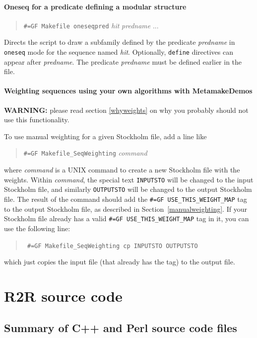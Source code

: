 \documentclass[letterpaper,12pt]{report}
\newcommand{\example}[1]{
\begin{quote}
{\raggedright
#1
}
\end{quote}
}
\newcommand{\examplett}[1]{
\example{{\tt #1}}
}
\begin{document}
\subsubsection{Oneseq for a predicate defining a modular structure}

\example{
{\tt \#=GF Makefile oneseqpred} {\it hit} {\it predname} ...
}
Directs the script to draw a subfamily defined by the predicate {\it predname}
in {\tt oneseq} mode for the sequence named {\it hit}.  Optionally, {\tt define}
directives can appear after {\it predname}.
The predicate {\it predname} must be defined earlier in the file.

\subsubsection{Weighting sequences using your own algorithms with MetamakeDemos}
\label{makefilemanualweighting}

{\bf WARNING:} please read section \ref{whyweights} on why you probably should not use this functionality.

To use manual weighting for a given Stockholm file, add a line like
\example{
{\tt \#=GF Makefile\_SeqWeighting} {\it command}
}
where {\it command} is a UNIX command to create a new Stockholm file with the weights.
Within {\it command}, the special text {\tt INPUTSTO} will be changed to the input Stockholm file, and similarly
{\tt OUTPUTSTO} will be changed to the output Stockholm file.
The result of the command should add the {\tt \#=GF USE\_THIS\_WEIGHT\_MAP} tag to the output Stockholm file,
as described in Section~\ref{manualweighting}.
If your Stockholm file already has a valid {\tt \#=GF USE\_THIS\_WEIGHT\_MAP} tag in it, you can use the following line:
\examplett{
\#=GF Makefile\_SeqWeighting cp INPUTSTO OUTPUTSTO
}
which just copies the input file (that already has the tag) to the output file.

\chapter{R2R source code}

\section{Summary of C++ and Perl source code files}
\end{document}
